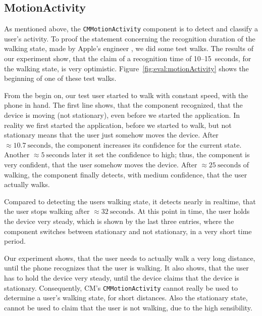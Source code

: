 \subsection{MotionActivity}
As mentioned above, the \texttt{CMMotionActivity} component is to detect and classify a user's activity. To proof the statement concerning the recognition duration of the walking state, made by Apple's engineer \citet{apple:wwdc_2014_pham}, we did some test walks. The results of our experiment show, that the claim of a recognition time of 10--15~seconds, for the walking state, is very optimistic. Figure~\ref{fig:eval:motionActivity} shows the beginning of one of these test walks.

From the begin on, our test user started to walk with constant speed, with the phone in hand. The first line shows, that the component recognized, that the device is moving (not stationary), even before we started the application. In reality we first started the application, before we started to walk, but not stationary means that the user just somehow moves the device. After $\approx 10.7~\text{seconds}$, the component increases its confidence for the current state. Another $\approx 5~\text{seconds}$ later it set the confidence to high; thus, the component is very confident, that the user somehow moves the device. After $\approx 25~\text{seconds}$ of walking, the component finally detects, with medium confidence, that the user actually walks.

Compared to detecting the users walking state, it detects nearly in realtime, that the user stops walking after $\approx 32~\text{seconds}$. At this point in time, the user holds the device very steady, which is shown by the last three entries, where the component switches between stationary and not stationary, in a very short time period.

Our experiment shows, that the user needs to actually walk a very long distance, until the phone recognizes that the user is walking. It also shows, that the user has to hold the device very steady, until the device claims that the device is stationary. Consequently, \ac{CM}'s \texttt{CMMotionActivity} cannot really be used to determine a user's walking state, for short distances. Also the stationary state, cannot be used to claim that the user is not walking, due to the high sensibility.

